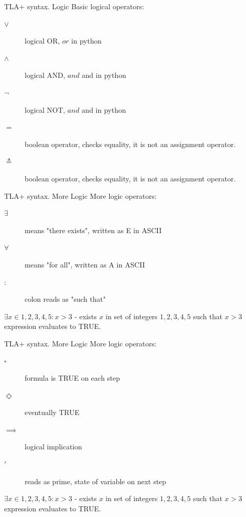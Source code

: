 \documentclass[12pt]{beamer}
\begin{document}
  \begin{frame}{TLA+ syntax. Logic}
      Basic logical operators:
      \begin{description}
        \item[$\lor$] logical OR, $or$ in python
        \item[$\land$] logical AND, $and$ and in python
        \item[$\lnot$] logical NOT, $and$ and in python
        \item[$=$] boolean operator, checks equality, it is not an assignment operator.
        \item[$\triangleq$] boolean operator, checks equality, it is not an assignment operator.
      \end{description}
  \end{frame}
  \begin{frame}{TLA+ syntax. More Logic}
      More logic operators:
      \begin{description}
        \item[$\exists$] means "there exists", written as E in ASCII
        \item[$\forall$]  means "for all", written as A in ASCII
        \item[$:$] colon reads as "such that"
      \end{description}
      $\exists x \in {1,2,3,4,5} : x > 3$ - exists $x$ in
      set of integers ${1,2,3,4,5}$ such that $x > 3$ expression evaluates
      to TRUE.
  \end{frame}
  \begin{frame}{TLA+ syntax. More Logic}
      More logic operators:
      \begin{description}
        \item[$\square$] formula is TRUE on each step
        \item[$\Diamond$] eventually TRUE
        \item[$\implies$] logical implication
        \item[$'$] reads as prime, state of variable on next step

      \end{description}
      $\exists x \in {1,2,3,4,5} : x > 3$ - exists $x$ in
      set of integers ${1,2,3,4,5}$ such that $x > 3$ expression evaluates
      to TRUE.
  \end{frame}
\end{document}
